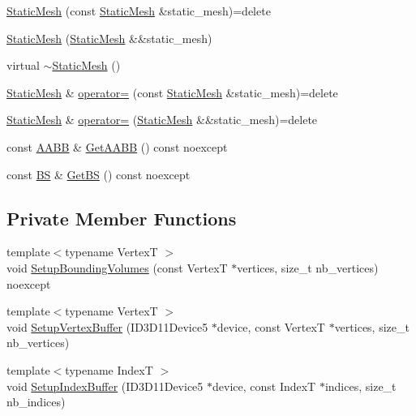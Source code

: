 \begin{DoxyCompactItemize}
\item 
\hyperlink{classmage_1_1_static_mesh_a15be69ad312c252c9816a57ec1555d73}{Static\+Mesh} (const \hyperlink{classmage_1_1_static_mesh}{Static\+Mesh} \&static\+\_\+mesh)=delete
\item 
\hyperlink{classmage_1_1_static_mesh_a4b3fab6fc753dc32d91bd8260ba3828f}{Static\+Mesh} (\hyperlink{classmage_1_1_static_mesh}{Static\+Mesh} \&\&static\+\_\+mesh)
\item 
virtual \hyperlink{classmage_1_1_static_mesh_a7fbae949f631d29913193a1b2c2ef658}{$\sim$\+Static\+Mesh} ()
\item 
\hyperlink{classmage_1_1_static_mesh}{Static\+Mesh} \& \hyperlink{classmage_1_1_static_mesh_af73dd102f2de9cf7529e380895cfc8ff}{operator=} (const \hyperlink{classmage_1_1_static_mesh}{Static\+Mesh} \&static\+\_\+mesh)=delete
\item 
\hyperlink{classmage_1_1_static_mesh}{Static\+Mesh} \& \hyperlink{classmage_1_1_static_mesh_a38912f8555053abba649bea160d56e46}{operator=} (\hyperlink{classmage_1_1_static_mesh}{Static\+Mesh} \&\&static\+\_\+mesh)=delete
\item 
const \hyperlink{structmage_1_1_a_a_b_b}{A\+A\+BB} \& \hyperlink{classmage_1_1_static_mesh_aaf793aaeccd66c2b1b172f2847db86ed}{Get\+A\+A\+BB} () const noexcept
\item 
const \hyperlink{structmage_1_1_b_s}{BS} \& \hyperlink{classmage_1_1_static_mesh_a007a31e6630f5095af7f1e468f12912f}{Get\+BS} () const noexcept
\end{DoxyCompactItemize}
\subsection*{Private Member Functions}
\begin{DoxyCompactItemize}
\item 
{\footnotesize template$<$typename VertexT $>$ }\\void \hyperlink{classmage_1_1_static_mesh_a532dcf96ac9b1bf7988a0726d1eb2fe5}{Setup\+Bounding\+Volumes} (const VertexT $\ast$vertices, size\+\_\+t nb\+\_\+vertices) noexcept
\item 
{\footnotesize template$<$typename VertexT $>$ }\\void \hyperlink{classmage_1_1_static_mesh_a51e5fd6cc526b8ecdfd7b06a33f50807}{Setup\+Vertex\+Buffer} (I\+D3\+D11\+Device5 $\ast$device, const VertexT $\ast$vertices, size\+\_\+t nb\+\_\+vertices)
\item 
{\footnotesize template$<$typename IndexT $>$ }\\void \hyperlink{classmage_1_1_static_mesh_ad9dbf64b48543424f008e664b7467360}{Setup\+Index\+Buffer} (I\+D3\+D11\+Device5 $\ast$device, const IndexT $\ast$indices, size\+\_\+t nb\+\_\+indices)
\end{DoxyCompactItemize}
